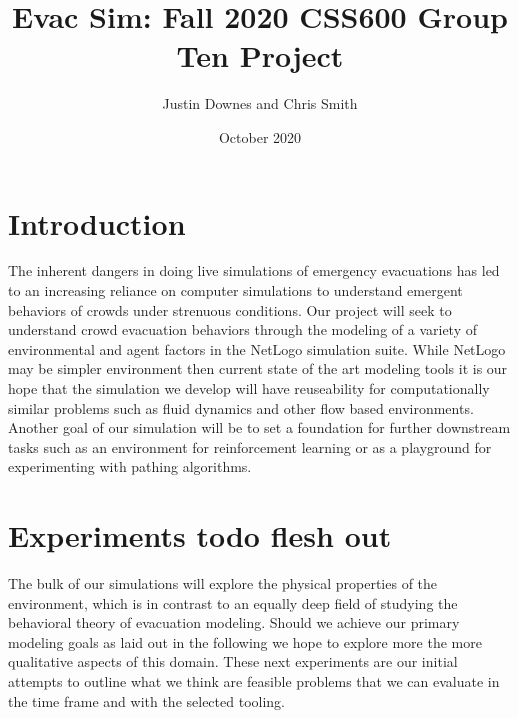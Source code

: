 \documentclass[12pt,letterpaper]{article}
\begin{document}
\title{\vspace{-3cm}Evac Sim: Fall 2020 CSS600 Group Ten Project}
\author{Justin Downes and Chris Smith}
\date{October 2020}
\maketitle

\section {Introduction}

The inherent dangers in doing live simulations of emergency evacuations has led to an increasing reliance on computer simulations to understand emergent behaviors of crowds under strenuous conditions\cite{almeidaCrowdSimulationModeling2013}.  Our project will seek to understand crowd evacuation behaviors through the modeling of a variety of environmental and agent factors in the NetLogo simulation suite. While NetLogo may be simpler environment then current state of the art modeling tools it is our hope that the simulation we develop will have reuseability for computationally similar problems such as fluid dynamics and other flow based environments. Another goal of our simulation will be to set a foundation for further downstream tasks such as an environment for reinforcement learning or as a playground for experimenting with pathing algorithms.

\section {Experiments todo flesh out}
The bulk of our simulations will explore the physical properties of the environment, which is in contrast to an equally deep field of studying the behavioral theory of evacuation modeling\cite{kuligowskil}.  Should we achieve our primary modeling goals as laid out in the following we hope to explore more the more qualitative aspects of this domain. These next experiments are our initial attempts to outline what we think are feasible problems that we can evaluate in the time frame and with the selected tooling.
\end{document}
